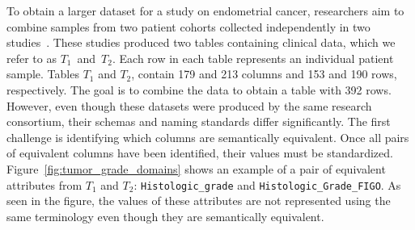 \vspace{-.5em}
\begin{example} \label{example1}
% 
% 
% 

To obtain a larger dataset for a study on endometrial cancer, researchers aim to combine samples from two patient cohorts collected independently in two studies~\cite{dou2020proteogenomic, dou2023proteogenomic}.
% 
These studies produced two tables containing clinical data, which we refer to as $T_1$~and~$T_2$. Each row in each table represents an individual patient sample.
Tables $T_1$ and $T_2$, contain 179 and 213 columns and 153 and 190 rows, respectively.
% 
The goal is to combine the data to obtain a table with 392 rows.
However, even though these datasets were produced by the same research consortium, their schemas and naming standards differ significantly.
The first challenge is identifying which columns are semantically equivalent. %
Once all pairs of equivalent columns have been identified, their values must be standardized.
Figure~\ref{fig:tumor_grade_domains} shows an example of a pair of equivalent attributes from $T_1$ and $T_2$: \texttt{Histologic\_grade} and \texttt{Histologic\_Grade\_FIGO}.
 As seen in the figure, the values of these attributes are not represented using the same terminology even though they are semantically equivalent.

\end{example}
